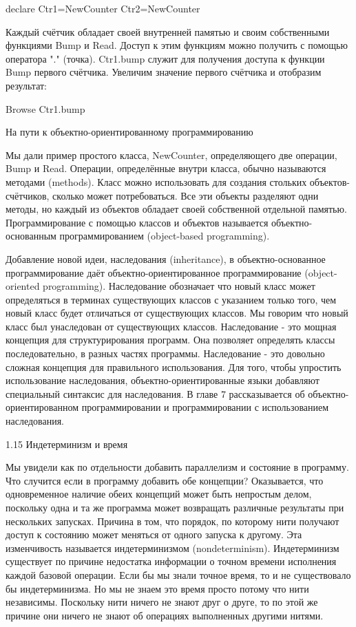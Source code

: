declare
Ctr1={NewCounter}
Ctr2={NewCounter}

Каждый счётчик обладает своей внутренней памятью и своим собственными функциями Bump и Read. Доступ к этим функциям можно получить с помощью оператора "." (точка). Ctr1.bump служит для получения доступа к функции Bump первого счётчика. Увеличим значение первого счётчика и отобразим результат:

{Browse {Ctr1.bump}}

На пути к объектно-ориентированному программированию

Мы дали пример простого класса, NewCounter, определяющего две операции, Bump и Read. Операции, определённые внутри класса, обычно называются методами (methods). Класс можно использовать для создания стольких объектов-счётчиков, сколько может потребоваться. Все эти объекты разделяют одни методы, но каждый из объектов обладает своей собственной отдельной памятью. Программирование с помощью классов и объектов называется объектно-основанным программированием (object-based programming).

Добавление новой идеи, наследования (inheritance), в объектно-основанное программирование даёт объектно-ориентированное программирование (object-oriented programming). Наследование обозначает что новый класс может определяться в терминах существующих классов с указанием только того, чем новый класс будет отличаться от существующих классов. Мы говорим что новый класс был унаследован от существующих классов. Наследование - это мощная концепция для структурирования программ. Она позволяет определять классы последовательно, в разных частях программы. Наследование - это довольно сложная концепция для правильного использования. Для того, чтобы упростить использование наследования, объектно-ориентированные языки добавляют специальный синтаксис для наследования. В главе 7 рассказывается об объектно-ориентированном программировании и программировании с использованием наследования.

1.15 Индетерминизм и время

Мы увидели как по отдельности добавить параллелизм и состояние в программу. Что случится если в программу добавить обе концепции? Оказывается, что одновременное наличие обеих концепций может быть непростым делом, поскольку одна и та же программа может возвращать различные результаты при нескольких запусках. Причина в том, что порядок, по которому нити получают доступ к состоянию может меняться от одного запуска к другому. Эта изменчивость называется индетерминизмом (nondeterminism). Индетерминизм существует по причине недостатка информации о точном времени исполнения каждой базовой операции. Если бы мы знали точное время, то и не существовало бы индетерминизма. Но мы не знаем это время просто потому что нити независимы. Поскольку нити ничего не знают друг о друге, то по этой же причине они ничего не знают об операциях выполненных другими нитями.

